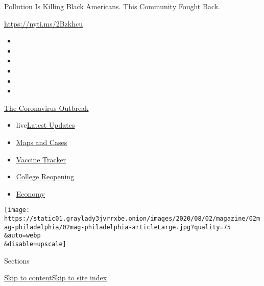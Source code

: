 Pollution Is Killing Black Americans. This Community Fought Back.

\url{https://nyti.ms/2Bzkhcu}

\begin{itemize}
\item
\item
\item
\item
\item
\item
\end{itemize}

\href{https://www.nytimes3xbfgragh.onion/news-event/coronavirus?action=click\&pgtype=Article\&state=default\&region=TOP_BANNER\&context=storylines_menu}{The
Coronavirus Outbreak}

\begin{itemize}
\tightlist
\item
  live\href{https://www.nytimes3xbfgragh.onion/2020/08/04/world/coronavirus-covid-19.html?action=click\&pgtype=Article\&state=default\&region=TOP_BANNER\&context=storylines_menu}{Latest
  Updates}
\item
  \href{https://www.nytimes3xbfgragh.onion/interactive/2020/us/coronavirus-us-cases.html?action=click\&pgtype=Article\&state=default\&region=TOP_BANNER\&context=storylines_menu}{Maps
  and Cases}
\item
  \href{https://www.nytimes3xbfgragh.onion/interactive/2020/science/coronavirus-vaccine-tracker.html?action=click\&pgtype=Article\&state=default\&region=TOP_BANNER\&context=storylines_menu}{Vaccine
  Tracker}
\item
  \href{https://www.nytimes3xbfgragh.onion/2020/08/02/us/covid-college-reopening.html?action=click\&pgtype=Article\&state=default\&region=TOP_BANNER\&context=storylines_menu}{College
  Reopening}
\item
  \href{https://www.nytimes3xbfgragh.onion/live/2020/08/03/business/stock-market-today-coronavirus?action=click\&pgtype=Article\&state=default\&region=TOP_BANNER\&context=storylines_menu}{Economy}
\end{itemize}

\texttt{[image: https://static01.graylady3jvrrxbe.onion/images/2020/08/02/magazine/02mag-philadelphia/02mag-philadelphia-articleLarge.jpg?quality=75\\\&auto=webp\\\&disable=upscale]}

Sections

\protect\hyperlink{site-content}{Skip to
content}\protect\hyperlink{site-index}{Skip to site index}

